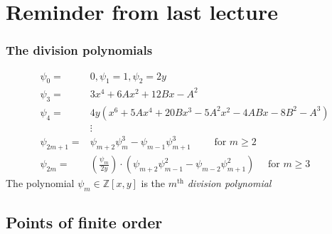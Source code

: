 \documentclass[10pt,handout]{beamer} %
\date{April 16, 2015}
\title[Elliptic curves over $\F_{q}$]{\insertlecture}
\subtitle{The group order}
\begin{document}
\begin{frame}
\titlepage
\end{frame}

\section{Reminder from last lecture}


\begin{frame}\frametitle{The division polynomials}

\begin{Definition}[Division Polynomials of $E:y^2=x^3+Ax+B$ ($p>3$)]\vspace*{-0.7cm}
\begin{align*}
        \psi_{0} =& 0,
        \psi_{1} = 1,
        \psi_{2} = 2y\\
        \psi_{3} =& 3x^{4} + 6Ax^{2} + 12Bx - A^{2}\\
        \psi_{4} =& 4y(x^{6} + 5Ax^{4} + 20Bx^{3} - 5A^{2}x^{2} - 4ABx - 8B^{2} - A^{3}) \\
        &\vdots\\
        \psi_{2m+1} =& \psi_{m+2}\psi_{m}^{3}-\psi_{m-1}\psi^{3}_{m+1} \qquad \text{ for } m \geq 2\\
        \psi_{2m}  =& \left(\frac{\psi_{m}}{2y}\right)\cdot(\psi_{m+2}\psi^{2}_{m-1}-\psi_{m-2}\psi^{2}_{m+1}) \quad \text{ for } m \geq 3
\end{align*}
The polynomial $\psi_m\in{\mathbb Z}[x,y]$ is the $m^{\text{th}}$ \emph{division polynomial}
\end{Definition}\pause
{}
\end{frame}

\subsection{Points of finite order}
\end{document}
